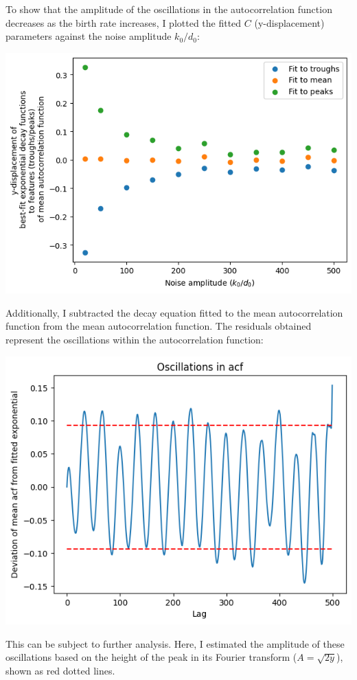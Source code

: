 \begin{enumerate}
\begin{enumerate}
\begin{enumerate}
To show that the amplitude of the oscillations in the autocorrelation function decreases as the birth rate increases, I plotted the fitted \(C\) (y-displacement) parameters against the noise amplitude \(k_{0}/d_{0}\):
\begin{center}
\includegraphics[width=.9\linewidth]{birthrate_vs_ydispl.png}
\end{center}

Additionally, I subtracted the decay equation fitted to the mean autocorrelation function from the mean autocorrelation function.  The residuals obtained represent the oscillations within the autocorrelation function:
\begin{center}
\includegraphics[width=.9\linewidth]{residual_example.png}
\end{center}

This can be subject to further analysis.  Here, I estimated the amplitude of these oscillations based on the height of the peak in its Fourier transform (\(A = \sqrt{2y}\)), shown as red dotted lines.


\end{enumerate}
\end{enumerate}
\end{enumerate}
